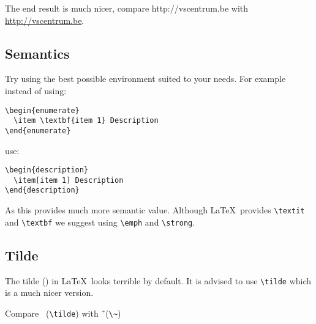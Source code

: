 \documentclass[11pt,a4paper]{article}
\begin{document}
The end result is much nicer, compare http://vscentrum.be with \url{http://vscentrum.be}.

\subsection{Semantics}

Try using the best possible environment suited to your needs. For example instead of using:
\begin{verbatim}
\begin{enumerate}
  \item \textbf{item 1} Description
\end{enumerate}
\end{verbatim}

use:

\begin{verbatim}
\begin{description}
  \item[item 1] Description
\end{description}
\end{verbatim}

As this provides much more semantic value. Although \LaTeX\ provides
\verb|\textit| and \verb|\textbf| we suggest using \verb|\emph| and
\verb|\strong|.

\subsection{Tilde}
\label{sec:tilde}

The tilde (\tilde) in \LaTeX\ looks terrible by default. It is advised to use
\verb|\tilde| which is a much nicer version.

Compare \tilde\ (\verb|\tilde|) with \~\ (\verb|\~|)
\end{document}
